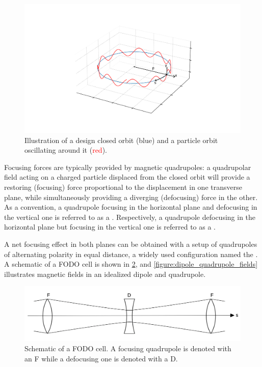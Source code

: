 \begin{figure}[!htb]
    \centering
    \includegraphics[width = 0.9\linewidth]{Figures/Beam_Dynamics_Theory/design_vs_particle_orbit.pdf}
    \caption{Illustration of a design closed orbit (\textcolor{mplblue}{blue}) and a particle orbit oscillating around it (\textcolor{red}{red}). }
    \label{figure:design_vs_particle_orbit}
\end{figure}

Focusing forces are typically provided by magnetic quadrupoles: a quadrupolar field acting on a charged particle displaced from the closed orbit will provide a restoring (focusing) force proportional to the displacement in one transverse plane, while simultaneously providing a diverging (defocusing) force in the other. 
As a convention, a quadrupole focusing in the horizontal plane and defocusing in the vertical one is referred to as a . 
Respectively, a quadrupole defocusing in the horizontal plane but focusing in the vertical one is referred to as a .

A net focusing effect in both planes can be obtained with a setup of quadrupoles of alternating polarity in equal distance, a widely used configuration named the .
A schematic of a FODO cell is shown in \cref{figure:fodo_cell_schematic}, and \cref{figure:dipole_quadrupole_fields} illustrates magnetic fields in an idealized dipole and quadrupole.

\begin{figure}[!htb]
    \centering
    \includegraphics[width = 0.8\linewidth]{Figures/Beam_Dynamics_Theory/fodo_cell_schematic.png}
    \caption{Schematic of a FODO cell. A focusing quadrupole is denoted with an F while a defocusing one is denoted with a D.}
    \label{figure:fodo_cell_schematic}
\end{figure}

